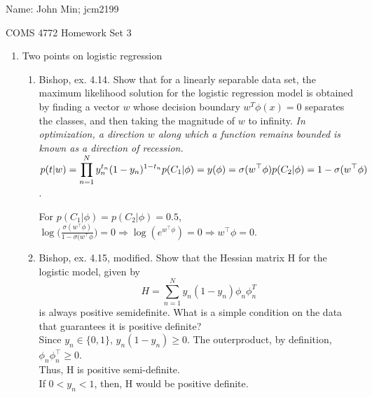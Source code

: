 \documentclass[12pt]{amsart}
\begin{document}
{\Large Name:}  John Min; jcm2199\\
\begin{center}
\Large COMS 4772 \hskip 2in Homework Set 3
\end{center}
\bigskip



\noindent

\begin{enumerate}

\item Two points on logistic regression

\begin{enumerate}

\item Bishop, ex. 4.14. Show that for a linearly separable data set, the maximum likelihood solution for the logistic regression model is obtained by 
finding a vector $w$ whose decision boundary $w^T \phi(x) = 0$ separates the classes, and then taking the magnitude of $w$ to infinity. 
{\it In optimization, a direction $w$ along which a function remains bounded is known as a direction of recession.}\\

$\displaystyle p(t|w) = \prod_{n=1}^{N} y_n^{t_n} (1-y_n)^{1-t_n} \\
p(C_1|\phi) = y(\phi) = \sigma(w^\top \phi) \\
p(C_2| \phi) = 1 - \sigma(w^\top \phi)$.

For $p(C_1 | \phi) = p(C_2 | \phi) = 0.5$, $\log \bigg( \frac{\sigma(w^\top \phi)}{1 - \sigma(w^\top \phi} \bigg) = 0 \Rightarrow \log(e^{w^\top \phi}) = 0 \Rightarrow w^\top \phi = 0.$ \\



\item Bishop, ex. 4.15, modified. Show that the Hessian matrix H for the logistic model, given by
\[
H = \sum_{n=1}^N y_n (1-y_n) \phi_n \phi_n^T
\]
is always positive semidefinite. What is a simple condition on the data that guarantees it is positive definite? \\

\noindent
Since $y_n \in \{0,1\}$, $y_n (1-y_n) \geq 0$.  The outerproduct, by definition, $\phi_n \phi_n^\top \geq 0$. \\
Thus, H is positive semi-definite.\\
If $0 < y_n < 1$, then, H would be positive definite. \\

\end{enumerate}



\end{enumerate}
\end{document}
